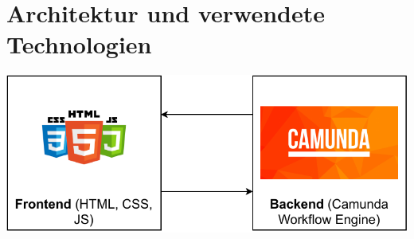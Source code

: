 \chapter{Architektur und verwendete Technologien}\label{ch:architektur-und-verwendete-technologien}

\includegraphics[width=1\textwidth]{resources/architecture}
